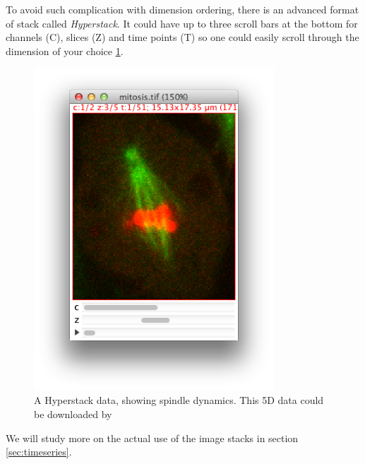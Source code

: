 To avoid such complication with dimension ordering, there is an advanced format of stack called \textit{Hyperstack}. It could have up to three scroll bars at the bottom for channels (C), slices (Z) and time points (T) so one could easily scroll through the dimension of your choice \ref{fig:heyperstack_mitosis}. 

\begin{figure}[h!]
\begin{center}
\includegraphics[width=9cm]{fig/Hyperstack_Mitosis.png}
\caption{ A Hyperstack data, showing spindle dynamics. This 5D data could be downloaded by }
\label{fig:heyperstack_mitosis}
\end{center}
\end{figure}

We will study more on the actual use of the image stacks in section \ref{sec:timeseries}.

